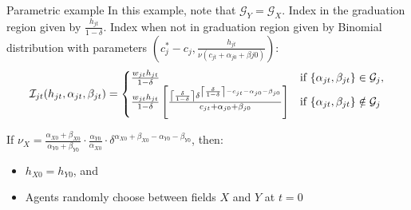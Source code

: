 \begin{frame}{Parametric example}
In this example, note that $\mathcal{G}_Y = \mathcal{G}_X$. Index in the graduation region given by $\frac{h_{jt}}{1 - \delta}$. Index when not in graduation region given by Binomial distribution with parameters $\left(c_j^* - c_j, \frac{h_{jt}}{\nu(c_{jt} + \alpha_{j0} + \beta{j0})}\right)$:
\begin{align*}
\mathcal{I}_{jt} (h_{jt}, \alpha_{jt}, \beta_{jt}) = 
\begin{cases}
\frac{w_{jt} h_{jt}}{1 - \delta} & \text{if } \{\alpha_{jt}, \beta_{jt}\} \in \mathcal{G}_{j}, \\
\frac{w_{jt} h_{jt}}{1 - \delta} \left[ 
   \frac{
      \left\lceil \frac{\delta}{1 - \delta} \right\rceil
      \delta^{\left\lceil \frac{\delta}{1 - \delta} \right\rceil - c_{jt} - \alpha_{j0} - \beta_{j0}}}
   {c_{jt} + \alpha_{j0} + \beta_{j0}}
    \right] & \text{if } \{\alpha_{jt}, \beta_{jt}\} \notin \mathcal{G}_{j} \\
\end{cases}
\end{align*}

\hyperlink{simulate}{}
\hyperlink{sim_beliefs}{}
\hyperlink{id_model_notes}{}
\end{frame}


\begin{frame}{}\label{app_ability_v_effect}

If 
$\nu_X = 
\frac{\alpha_{X0} + \beta_{X0}}{\alpha_{Y0} + \beta_{Y0}} 
\cdot \frac{\alpha_{Y0}}{\alpha_{X0}}
\cdot \delta^{\alpha_{X0} + \beta_{X0} - \alpha_{Y0} - \beta_{Y0}}$, then:
\begin{itemize}
     \item $h_{X0} = h_{Y0}$, and
     \item Agents randomly choose between fields $X$ and $Y$ at $t=0$
 \end{itemize}  
\begin{figure}
\centering

\end{figure}
\hyperlink{app_v_effects}{}
\hyperlink{sim_beliefs}{}

\end{frame}


